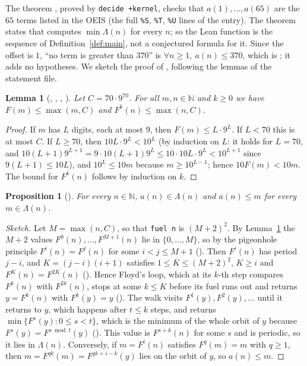 \documentclass[11pt]{amsart}
\theoremstyle{plain}
\newtheorem{lemma}[theorem]{Lemma}
\newtheorem{proposition}[theorem]{Proposition}
\theoremstyle{definition}
\newcommand{\N}{\mathbb{N}}
\newcommand{\Cyc}{\Lambda}
\begin{document}
The theorem , proved by \texttt{decide +kernel}, checks that $a(1),\dots,a(65)$ are the $65$ terms listed in the OEIS (the full \texttt{\%S}, \texttt{\%T}, \texttt{\%U} lines of the entry).
The theorem  states that  computes $\min\Cyc(n)$ for every $n$; so the Lean function  is the sequence of Definition~\ref{def:main}, not a conjectured formula for it.
Since the offset is $1$, ``no term is greater than $370$'' is $\forall n\ge1,\ a(n)\le370$, which is ; it adds no hypotheses.
We sketch the proof of , following the lemmas of the statement file.

\begin{lemma}[, , , ]\label{lem:bound}
Let $C=70\cdot9^{70}$. For all $m,n\in\N$ and $k\ge0$ we have $F(m)\le\max(m,C)$ and $F^k(n)\le\max(n,C)$.
\end{lemma}

\begin{proof}
If $m$ has $L$ digits, each at most $9$, then $F(m)\le L\cdot9^L$. If $L<70$ this is at most $C$. If $L\ge70$, then $10L\cdot9^L<10^L$ (by induction on $L$: it holds for $L=70$, and $10(L+1)9^{L+1}=9\cdot10(L+1)9^L\le10\cdot10L\cdot9^L<10^{L+1}$ since $9(L+1)\le10L$), and $10^L\le10m$ because $m\ge10^{L-1}$; hence $10F(m)<10m$. The bound for $F^k(n)$ follows by induction on $k$.
\end{proof}

\begin{proposition}[]\label{prop:spec}
For every $n\in\N$, $a(n)\in\Cyc(n)$ and $a(n)\le m$ for every $m\in\Cyc(n)$.
\end{proposition}

\begin{proof}[Sketch]
Let $M=\max(n,C)$, so that \texttt{fuel n} is $(M+2)^2$. By Lemma~\ref{lem:bound} the $M+2$ values $F^0(n),\dots,F^{M+1}(n)$ lie in $\{0,\dots,M\}$, so by the pigeonhole principle $F^i(n)=F^j(n)$ for some $i<j\le M+1$ (). Then $F^i(n)$ has period $j-i$, and $K=(j-i)(i+1)$ satisfies $1\le K\le(M+2)^2$, $K\ge i$ and $F^K(n)=F^{2K}(n)$ (). Hence Floyd's loop, which at its $k$-th step compares $F^k(n)$ with $F^{2k}(n)$, stops at some $k\le K$ before its fuel runs out and returns $y=F^k(n)$ with $F^k(y)=y$ (). The walk  visits $F^1(y),F^2(y),\dots$ until it returns to $y$, which happens after $t\le k$ steps, and returns $\min\{F^s(y):0\le s<t\}$, which is the minimum of the whole orbit of $y$ because $F^s(y)=F^{s\bmod t}(y)$ (). This value is $F^{s+k}(n)$ for some $s$ and is periodic, so it lies in $\Cyc(n)$. Conversely, if $m=F^i(n)$ satisfies $F^q(m)=m$ with $q\ge1$, then $m=F^{qk}(m)=F^{qk+i-k}(y)$ lies on the orbit of $y$, so $a(n)\le m$.
\end{proof}
\end{document}
